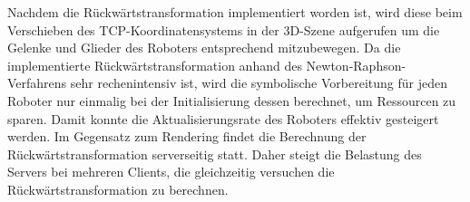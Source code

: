 Nachdem die Rückwärtstransformation implementiert worden ist,
wird diese beim Verschieben des TCP-Koordinatensystems in der 3D-Szene aufgerufen um die Gelenke und Glieder des Roboters entsprechend mitzubewegen.
Da die implementierte Rückwärtstransformation anhand des Newton-Raphson-Verfahrens sehr rechenintensiv ist, wird die symbolische Vorbereitung für jeden
Roboter nur einmalig bei der Initialisierung dessen berechnet, um Ressourcen zu sparen.
Damit konnte die Aktualisierungsrate des Roboters effektiv gesteigert werden.
Im Gegensatz zum Rendering findet die Berechnung der Rückwärtstransformation serverseitig statt.
Daher steigt die Belastung des Servers bei mehreren Clients, die gleichzeitig versuchen die Rückwärtstransformation
zu berechnen.


























